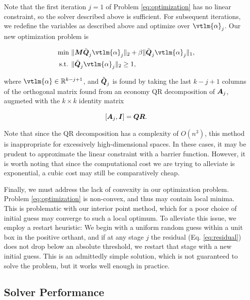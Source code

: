 \documentclass[]{aiaa-tc}%
\begin{document}
Note that the first iteration $j=1$ of Problem \ref{eq:optimization} has no linear constraint, so the solver described above is sufficient. For subsequent iterations, we redefine the variables as described above and optimize over $\vtlm{\alpha}_j$. Our new optimization problem is

\begin{equation}
\begin{aligned}
\label{eq:optimization_reparam}
\text{min  }& \|\mM\tilde{\mQ}_j\vtlm{\alpha}_j\|_2 + \beta\|\tilde{\mQ}_j\vtlm{\alpha}_j\|_1, \\
\text{s.t. }& \|\tilde{\mQ}_j\vtlm{\alpha}_j\|_2\geq1,
\end{aligned}
\end{equation}

where $\vtlm{\alpha}\in\mathbb{R}^{k-j+1}$, and $\tilde{\boldsymbol{Q}}_j$ is found by taking the last $k-j+1$ columns of the orthogonal matrix found from an economy QR decomposition of $\boldsymbol{A}_j$, augmeted with the $k\times k$ identity matrix

\begin{equation}
\label{eq:augmeted_matrix}
[\boldsymbol{A}_j,\boldsymbol{I}] = \boldsymbol{Q}\boldsymbol{R}.
\end{equation}

Note that since the QR decomposition has a complexity of $O(n^3)$, this method is inappropriate for excessively high-dimensional spaces. In these cases, it may be prudent to approximate the linear constraint with a barrier function. However, it is worth noting that since the computational cost we are trying to alleviate is exponential, a cubic cost may still be comparatively cheap.

Finally, we must address the lack of convexity in our optimization problem. Problem \ref{eq:optimization} is non-convex, and thus may contain local minima. This is problematic with our interior point method, which for a poor choice of initial guess may converge to such a local optimum. To alleviate this issue, we employ a restart heuristic: We begin with a uniform random guess within a unit box in the positive orthant, and if at any stage $j$ the residual (Eq. \ref{eq:residual}) does not drop below an absolute threshold, we restart that stage with a new initial guess. This is an admittedly simple solution, which is not guaranteed to solve the problem, but it works well enough in practice.

\subsection{Solver Performance} \label{sec:solver_performance}
\end{document}

